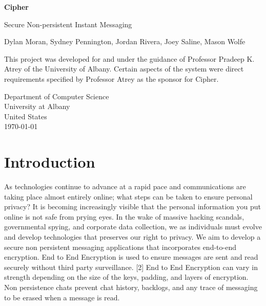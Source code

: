 \documentclass[11pt]{article}
\theoremstyle{plain}
\theoremstyle{definition}
\begin{document}
\begin{titlepage}
   \begin{center}
   
    \vspace*{1cm}
    \Huge{
        
        \textbf{Cipher}
    }
    
    \vspace{0.5cm}
    \Huge{
        Secure Non-persistent Instant Messaging
    }
    
    \vspace{1.5cm}
    \large{
        Dylan Moran, Sydney Pennington, Jordan Rivera, Joey Saline, Mason Wolfe
    }

    \vfill
    This project was developed for and under the guidance of Professor Pradeep K. Atrey of the University of Albany. Certain aspects of the system were direct requirements specified by Professor Atrey as the sponsor for Cipher.
            
    \vspace{0.8cm}
                 
    Department of Computer Science\\
    University at Albany\\
    United States\\
    \today
            
   \end{center}
\end{titlepage}



\section{Introduction}\label{sec:intro}
As technologies continue to advance at a rapid pace and communications are taking place almost entirely online; what steps can be taken to ensure personal privacy? It is becoming increasingly visible that the personal information you put online is not safe from prying eyes. In the wake of massive hacking scandals, governmental spying, and corporate data collection, we as individuals must evolve and develop technologies that preserves our right to privacy. We aim to develop a secure non persistent messaging applications that incorporates end-to-end encryption. End to End Encryption is used to ensure messages are sent and read securely without third party surveillance. [2] End to End Encryption can vary in strength depending on the size of the keys, padding, and layers of encryption. Non persistence chats prevent chat history, backlogs, and any trace of messaging to be erased when a message is read.
\end{document}
